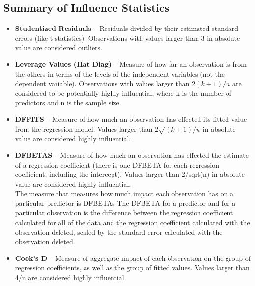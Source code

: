 \documentclass[12pt, a4paper]{article}
\begin{document}
\subsection{Summary of Influence Statistics}
\begin{itemize}
	\item	\textbf{Studentized Residuals} – Residuals divided by their estimated standard errors (like t-statistics). Observations with values larger than 3 in absolute value are considered outliers.
	\item	\textbf{Leverage Values (Hat Diag)} – Measure of how far an observation is from the others in terms of the levels of the independent variables (not the dependent variable). Observations with values larger than $2(k+1)/n$ are considered to be potentially highly influential, where k is the number of predictors and n is the sample size.
	\item	\textbf{DFFITS} – Measure of how much an observation has effected its fitted value from the regression model. Values larger than $2\sqrt{(k+1)/n}$ in absolute value are considered highly influential. %
	\item	\textbf{DFBETAS} – Measure of how much an observation has effected the estimate of a regression coefficient (there is one DFBETA for each regression coefficient, including the intercept). Values larger than 2/sqrt(n) in absolute value are considered highly influential.
	\\
	The measure that measures how much impact each observation has on a particular predictor is DFBETAs The DFBETA for a predictor and for a particular observation is the difference between the regression coefficient calculated for all of the data and the regression coefficient calculated with the observation deleted, scaled by the standard error calculated with the observation deleted. 
	
	\item	\textbf{Cook’s D} – Measure of aggregate impact of each observation on the group of regression coefficients, as well as the group of fitted values. Values larger than 4/n are considered highly influential.
\end{itemize}
\newpage
\end{document}
